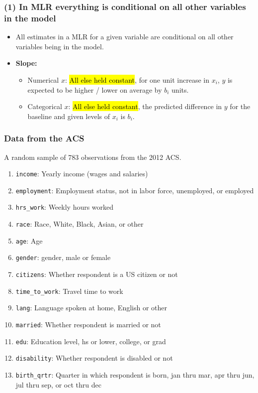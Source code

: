 \documentclass[slidestop,compress,mathserif,12pt,t,professionalfonts,xcolor=table]{beamer}
\begin{document}
\begin{frame}[fragile]
\frametitle{(1) In MLR everything is conditional on all other variables in the model}

\begin{itemize}

\item All estimates in a MLR for a given variable are conditional on all other variables being in the model.

\item \textbf{Slope:} 
\begin{itemize}
\item Numerical $x$: \hl{All else held constant}, for one unit increase in $x_i$, $y$ is expected to be higher / lower on average by $b_i$ units.
\item Categorical $x$: \hl{All else held constant}, the predicted difference in $y$ for the baseline and given levels of $x_i$ is $b_i$.
\end{itemize}

\end{itemize}

\end{frame}


\begin{frame}
\frametitle{Data from the ACS}

A random sample of 783 observations from the 2012 ACS.

{\scriptsize
\begin{enumerate}
\item \texttt{income}: Yearly income (wages and salaries)
\item \texttt{employment}: Employment status, not in labor force, unemployed, or employed
\item \texttt{hrs\_work}: Weekly hours worked
\item \texttt{race}: Race, White, Black, Asian, or other
\item \texttt{age}: Age
\item \texttt{gender}: gender, male or female
\item \texttt{citizens}: Whether respondent is a US citizen or not
\item \texttt{time\_to\_work}: Travel time to work
\item \texttt{lang}: Language spoken at home, English or other
\item \texttt{married}: Whether respondent is married or not
\item \texttt{edu}: Education level, hs or lower, college, or grad
\item \texttt{disability}: Whether respondent is disabled or not
\item \texttt{birth\_qrtr}: Quarter in which respondent is born, jan thru mar, apr thru jun, jul thru sep, or oct thru dec 
\end{enumerate}
}

\end{frame}
\end{document}
